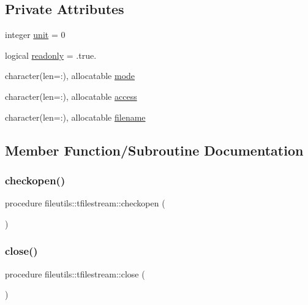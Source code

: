 \subsection*{Private Attributes}
\begin{DoxyCompactItemize}
\item 
integer \mbox{\hyperlink{structfileutils_1_1tfilestream_a34c79016a1bd40e591ee61dcd05c813e}{unit}} = 0
\item 
logical \mbox{\hyperlink{structfileutils_1_1tfilestream_aa07cc9e28490c59bebe31cf4f1a4158e}{readonly}} = .true.
\item 
character(len=\+:), allocatable \mbox{\hyperlink{structfileutils_1_1tfilestream_a4d11359c4e62e402df37f96fc9a47055}{mode}}
\item 
character(len=\+:), allocatable \mbox{\hyperlink{structfileutils_1_1tfilestream_a0dce9f45873c29e424a0fb4b1c20fbc2}{access}}
\item 
character(len=\+:), allocatable \mbox{\hyperlink{structfileutils_1_1tfilestream_a040716c375044d68d5c033033499c217}{filename}}
\end{DoxyCompactItemize}


\subsection{Member Function/\+Subroutine Documentation}
\mbox{\label{structfileutils_1_1tfilestream_a2da290d67309dc43c6858bb8d5568e9e}} 
\subsubsection{\texorpdfstring{checkopen()}{checkopen()}}
{\footnotesize\ttfamily procedure fileutils\+::tfilestream\+::checkopen (\begin{DoxyParamCaption}{ }\end{DoxyParamCaption})\hspace{0.3cm}{\ttfamily [private]}}

\mbox{\label{structfileutils_1_1tfilestream_adc4c0ea57628e670378555814c88c52a}} 
\subsubsection{\texorpdfstring{close()}{close()}}
{\footnotesize\ttfamily procedure fileutils\+::tfilestream\+::close (\begin{DoxyParamCaption}{ }\end{DoxyParamCaption})\hspace{0.3cm}{\ttfamily [private]}}

